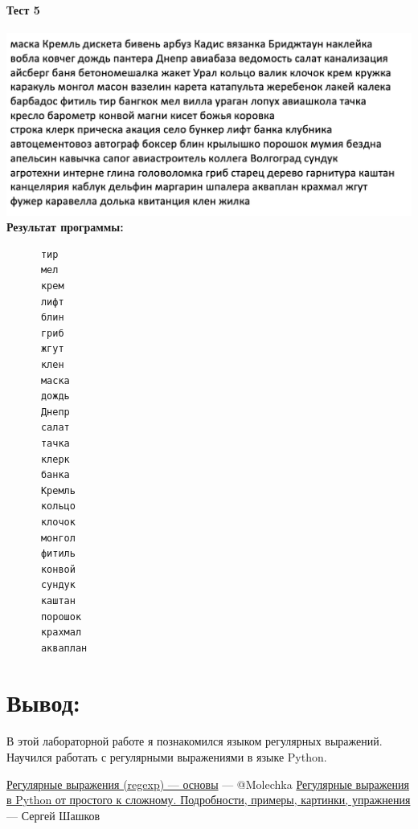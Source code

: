 \documentclass[12pt,onecolumn]{article}
\begin{document}
\begin{flushleft}
\paragraph{Тест 5}
\hfill \break
\includegraphics[scale=0.4]{prog3/p5.png}\\
\textbf{Результат программы:}\\
\begingroup
    \fontsize{10pt}{12pt}\selectfont
    \begin{verbatim}  
      тир
      мел
      крем
      лифт
      блин
      гриб
      жгут
      клен
      маска
      дождь
      Днепр
      салат
      тачка
      клерк
      банка
      Кремль
      кольцо
      клочок
      монгол
      фитиль
      конвой
      сундук
      каштан
      порошок
      крахмал
      акваплан
    \end{verbatim}  
\endgroup
\section{Вывод:}
В этой лабораторной работе я познакомился языком регулярных выражений. Научился работать с регулярными выражениями в языке Python.
\end{flushleft}
\begin{thebibliography}{2}
\href{https://habr.com/ru/post/545150/}{Регулярные выражения (regexp) — основы} --- @Molechka
\href{https://habr.com/ru/post/349860/}{Регулярные выражения в Python от простого к сложному. Подробности, примеры, картинки, упражнения} --- Сергей Шашков
\end{thebibliography}
\end{document}
